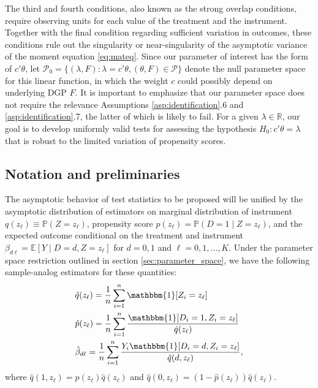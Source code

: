 \documentclass[11pt]{article}
\theoremstyle{definition}
\newcommand{\R}{\ensuremath{\mathbb{R}}}
\newcommand{\Exp}{\ensuremath{\mathbb{E}}} %
\newcommand{\Prob}{\ensuremath{\mathbb{P}}} %
\newcommand{\0}{\ensuremath{\mathbf{0}}}
\newcommand{\indicator}{\ensuremath{\mathbbm{1}}}
\begin{document}
\begin{bibunit}
The third and fourth conditions, also known as the strong overlap conditions, require observing units for each value of the treatment and the instrument. Together with the final condition regarding sufficient variation in outcomes, these conditions rule out the singularity or near-singularity of the asymptotic variance of the moment equation \eqref{eq:mateq}. Since our parameter of interest has the form of $c'\theta$, let $\mathcal{P}_0 = \{(\lambda,F): \lambda = c'\theta, (\theta,F)\in\mathcal{P}\}$ denote the null parameter space for this linear function, in which the weight $c$ could possibly depend on underlying DGP $F$. It is important to emphasize that our parameter space does not require the relevance Assumptions \ref{asp:identification}.6 and \ref{asp:identification}.7, the latter of which is likely to fail. For a given  $\lambda \in \R$, our goal is to develop uniformly valid tests for assessing the hypothesis $H_0: c'\theta = \lambda$ that is robust to the limited variation of propensity scores.



\subsection{Notation and preliminaries}
\label{sec:notation}
The asymptotic behavior of test statistics to be proposed will be unified by the asymptotic distribution of estimators on marginal distribution of instrument $q(z_\ell) \equiv \Prob(Z=z_\ell)$, propensity score $p(z_\ell) = \Prob(D=1\mid Z=z_\ell)$, and the expected outcome conditional on the treatment and instrument $\beta_{d\ell} = \Exp[Y\mid D=d, Z=z_\ell]$ for $d=0,1$ and $\ell = 0,1,\ldots,K$. Under the parameter space restriction outlined in section \ref{sec:parameter_space}, we have the following sample-analog estimators for these quantities:
\begin{align*}
		&\hat{q}(z_\ell) = \frac{1}{n}\sum_{i=1}^n \indicator[Z_i =z_\ell] \\
		&\hat{p}(z_\ell) = \frac{1}{n}\sum_{i=1}^n \frac{\indicator[D_i = 1, Z_i = z_\ell]}{\hat{q}(z_\ell)} \\
		&\hat{\beta}_{d\ell} = \frac{1}{n}\sum_{i=1}^n\frac{Y_i\indicator[D_i = d, Z_i = z_\ell]}{\hat{q}(d,z_\ell)},
\end{align*}
where $\hat{q}(1,z_\ell) = \hat{p}(z_\ell)\hat{q}(z_\ell)$ and $\hat{q}(0,z_\ell) = (1-\hat{p}(z_\ell))\hat{q}(z_\ell)$. 


\end{bibunit}
\end{document}

